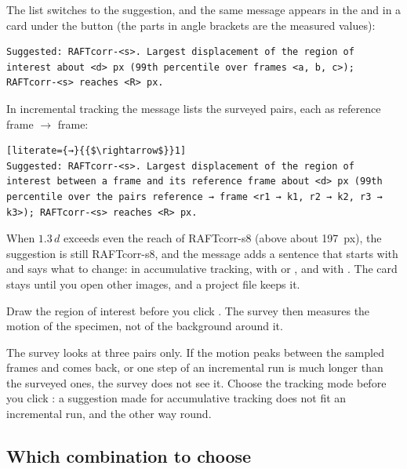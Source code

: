 The  list switches to the suggestion, and the same message appears in the 
and in a card under the button (the parts in angle brackets are the measured values):
\begin{lstlisting}
Suggested: RAFTcorr-<s>. Largest displacement of the region of interest about <d> px (99th percentile over frames <a, b, c>); RAFTcorr-<s> reaches <R> px.
\end{lstlisting}
In incremental tracking the message lists the surveyed pairs, each as reference frame
$\rightarrow$ frame:
\begin{lstlisting}[literate={→}{{$\rightarrow$}}1]
Suggested: RAFTcorr-<s>. Largest displacement of the region of interest between a frame and its reference frame about <d> px (99th percentile over the pairs reference → frame <r1 → k1, r2 → k2, r3 → k3>); RAFTcorr-<s> reaches <R> px.
\end{lstlisting}
When $1.3\,d$ exceeds even the reach of RAFTcorr-s8 (above about 197~px), the suggestion is still
RAFTcorr-s8, and the message adds a sentence that starts with  and says what to change:  in accumulative tracking,
 with  or , and
 with . The card
stays until you open other images, and a project file keeps it.

\begin{tipbox}
Draw the region of interest before you click . The survey then measures the
motion of the specimen, not of the background around it.
\end{tipbox}

\begin{notebox}
The survey looks at three pairs only. If the motion peaks between the sampled frames and comes
back, or one step of an incremental run is much longer than the surveyed ones, the survey does
not see it. Choose the tracking mode before you click : a suggestion made
for accumulative tracking does not fit an incremental run, and the other way round.
\end{notebox}

\subsection{Which combination to choose}

